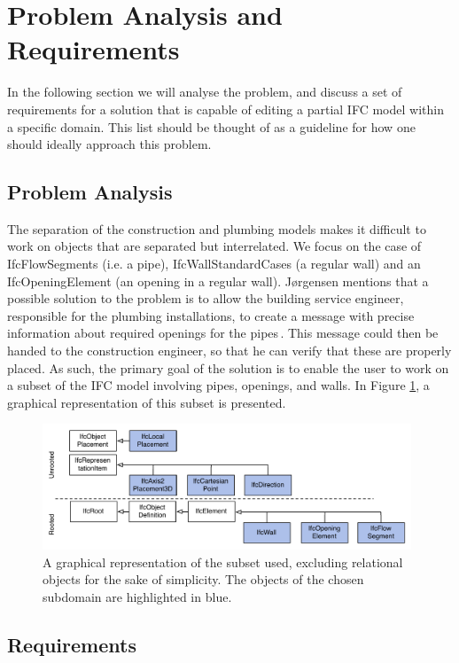 \section{Problem Analysis and Requirements}
\label{sec:problem_analysis_and_requirements}
In the following section we will analyse the problem, and discuss a set of requirements for a solution that is capable of editing a partial IFC model within a specific domain. This list should be thought of as a guideline for how one should ideally approach this problem.

\subsection{Problem Analysis}
\label{subsec:problem_analysis}
The separation of the construction and plumbing models makes it difficult to work on objects that are separated but interrelated. We focus on the case of IfcFlowSegments (i.e. a pipe), IfcWallStandardCases (a regular wall) and an IfcOpeningElement (an opening in a regular wall). Jørgensen mentions that a possible solution to the problem is to allow the building service engineer, responsible for the plumbing installations, to create a message with precise information about required openings for the pipes\,\cite{jorgensen12}. This message could then be handed to the construction engineer, so that he can verify that these are properly placed. As such, the primary goal of the solution is to enable the user to work on a subset of the IFC model involving pipes, openings, and walls. In Figure \ref{fig:ifcheirachy}, a graphical representation of this subset is presented.

\begin{figure}[t]
    \centering
        \includegraphics[width=110mm]{images/IfcHeirachy.pdf}
    \caption{A graphical representation of the subset used, excluding relational objects for the sake of simplicity. The objects of the chosen subdomain are highlighted in blue.}
    \label{fig:ifcheirachy}
\end{figure}

\subsection{Requirements}
\label{subsec:requirements}

